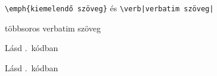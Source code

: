 \documentclass[a4paper,12pt]{article}
\begin{document}
	\verb|\emph{kiemelendő szöveg}| és \verb*+\verb|verbatim szöveg|+
	\begin{verbatim*}
		többsoros
		    verbatim szöveg
	\end{verbatim*}
	
	
	
	Lásd \az{\ref{kod-delphi}}.~kódban
	
	Lásd \az{\ref{masik-delphi}}.~kódban
\end{document}
